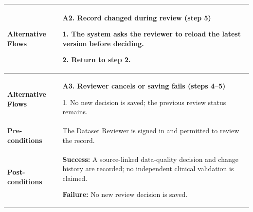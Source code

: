 \begin{longtable}{|p{}|p{}|}
\textbf{Alternative Flows} &
\textbf{A2. Record changed during review (step 5)}\par
1. The system asks the reviewer to reload the latest version before deciding.\par
2. Return to step 2.
\\ \hline
\textbf{Alternative Flows} &
\textbf{A3. Reviewer cancels or saving fails (steps 4--5)}\par
1. No new decision is saved; the previous review status remains.
\\ \hline
\textbf{Pre-conditions} &
The Dataset Reviewer is signed in and permitted to review the record.
\\ \hline
\textbf{Post-conditions} &
\textbf{Success:} A source-linked data-quality decision and change history are recorded; no independent clinical validation is claimed.\par
\textbf{Failure:} No new review decision is saved.
\\ \hline
\end{longtable}
